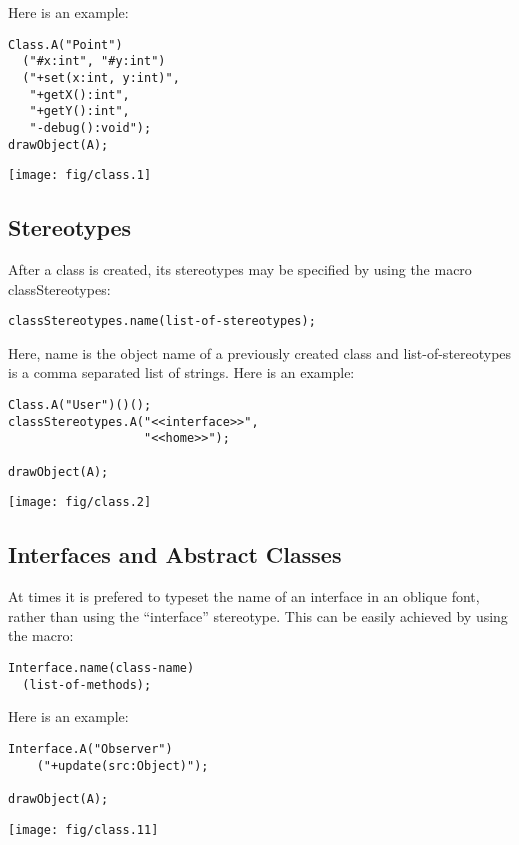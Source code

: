\documentclass{article}
\newcommand{\code}{\ttfamily}
\begin{document}
Here is an example:

\begin{multicols}{2}
\begin{verbatim}
Class.A("Point")
  ("#x:int", "#y:int")
  ("+set(x:int, y:int)",
   "+getX():int",
   "+getY():int",
   "-debug():void");
drawObject(A);
\end{verbatim}
\columnbreak
\texttt{[image: fig/class.1]}
\end{multicols}

\subsection{Stereotypes}

After a class is created, its stereotypes may be specified by using the macro {\code classStereotypes}:

\begin{verbatim}
classStereotypes.name(list-of-stereotypes);
\end{verbatim}

Here, {\code name} is the object name of a previously created class and {\code list-of-stereotypes}
is a comma separated list of strings. Here is an example:

\begin{multicols}{2}
\begin{verbatim}
Class.A("User")()();
classStereotypes.A("<<interface>>",
                   "<<home>>");

drawObject(A);
\end{verbatim}
\columnbreak
\hspace{1cm}\texttt{[image: fig/class.2]}
\end{multicols}

\subsection{Interfaces and Abstract Classes}

At times it is prefered to typeset the name of an interface in an oblique font, rather than using the ``interface'' stereotype. This can be easily achieved by using the macro:

\begin{verbatim}
Interface.name(class-name)
  (list-of-methods);
\end{verbatim}

Here is an example:

\begin{multicols}{2}
\begin{verbatim}
Interface.A("Observer")
    ("+update(src:Object)");

drawObject(A);
\end{verbatim}
\columnbreak
\hspace{1cm}\texttt{[image: fig/class.11]}
\end{multicols}
\end{document}
